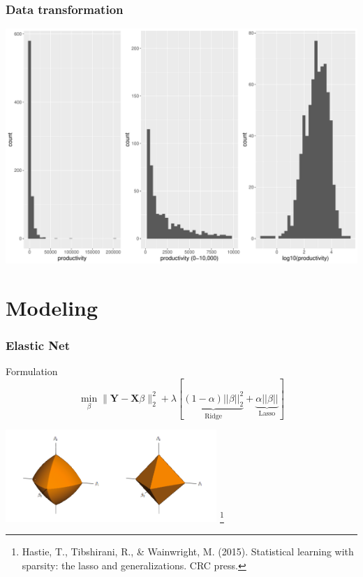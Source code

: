 \documentclass{beamer}
\newcommand{\bX}{\mathbf{X}}
\newcommand{\bY}{\mathbf{Y}}
\begin{document}
\begin{frame}
\frametitle{Data transformation}
\centering

\includegraphics[scale=0.35]{production_histograms}
\end{frame}

\section{Modeling}

\begin{frame}
\frametitle{Elastic Net}

\begin{block}{Formulation}
	\[\min_{\beta}  \|\bY - \bX\beta\|_{2}^{2} + \lambda[ \underbrace{(1 - \alpha)||\beta||_2^2}_\text{Ridge} + \underbrace{\alpha||\beta||}_\text{Lasso}]\]
\end{block}


\centering
\includegraphics[width=8cm]{elastic3d} \footnote{Hastie, T., Tibshirani, R., \& Wainwright, M. (2015). Statistical learning with sparsity: the lasso and 
generalizations. CRC press.}

\end{frame}
\end{document}
